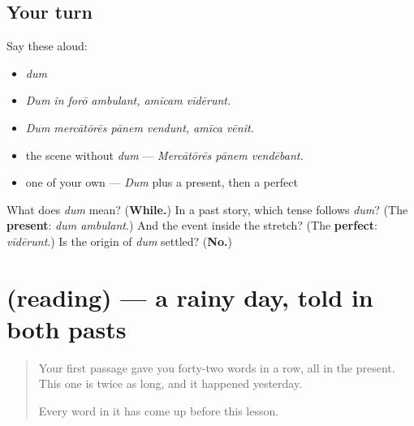 \subsection*{Your turn}
Say these aloud:

\begin{itemize}
\raggedright
  \item \emph{dum}
  \item \emph{Dum in forō ambulant, amīcam vīdērunt.}
  \item \emph{Dum mercātōrēs pānem vendunt, amīca vēnit.}
  \item the scene without \emph{dum} — \emph{Mercātōrēs pānem vendēbant.}
  \item one of your own — \emph{Dum} plus a present, then a perfect
\end{itemize}

\begin{tcolorbox}[breakable,colback=teal!4,colframe=teal!35!black,title={Before you move on}]
What does \emph{dum} mean? (\textbf{While.}) In a past story, which tense follows \emph{dum}? (The \textbf{present}: \emph{dum ambulant}.) And the event inside the stretch? (The \textbf{perfect}: \emph{vīdērunt}.) Is the origin of \emph{dum} settled? (\textbf{No.})
\end{tcolorbox}
\section[(reading)]{(reading) — a rainy day, told in both pasts}

\label{lesson:LA-C282-lectio}



\begin{quote}
Your first passage gave you forty-two words in a row, all in the present. This one is twice as long, and it happened yesterday.

Every word in it has come up before this lesson.
\end{quote}

